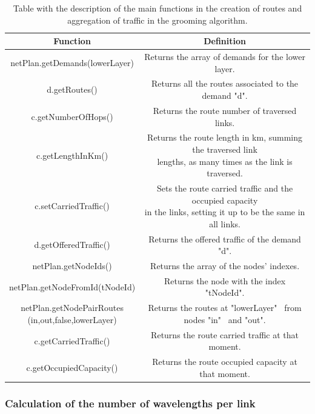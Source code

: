 \begin{table}[H]
\centering
\begin{tabular}{|| c | c ||}
 \hline
 Function & Definition \\
 \hline\hline
 netPlan.getDemands(lowerLayer) & Returns the array of demands for the lower layer. \\
 \hline
 d.getRoutes() & Returns all the routes associated to the demand "d". \\
 \hline
 c.getNumberOfHops() & Returns the route number of traversed links. \\
 \hline
 c.getLengthInKm() & \makecell{Returns the route length in km, summing the traversed link\\lengths, as many times as the link is traversed.} \\
 \hline
 c.setCarriedTraffic() & \makecell{Sets the route carried traffic and the occupied capacity\\in the links, setting it up to be the same in all links.} \\
 \hline
 d.getOfferedTraffic() & Returns the offered traffic of the demand "d". \\
 \hline
 netPlan.getNodeIds() & Returns the array of the nodes' indexes. \\
 \hline
 netPlan.getNodeFromId(tNodeId) & Returns the node with the index "tNodeId". \\
 \hline
 \makecell{netPlan.getNodePairRoutes\\(in,out,false,lowerLayer)} & Returns the routes at "lowerLayer" \ from nodes "in" \ and "out". \\
 \hline
 c.getCarriedTraffic() & Returns the route carried traffic at that moment. \\
 \hline
 c.getOccupiedCapacity() & Returns the route occupied capacity at that moment. \\
 \hline
\end{tabular}
\caption{Table with the description of the main functions in the creation of routes and aggregation of traffic in the grooming algorithm.}
\label{grooming_table_variables_translucent_surv}
\end{table}

\subsubsection{Calculation of the number of wavelengths per link}

